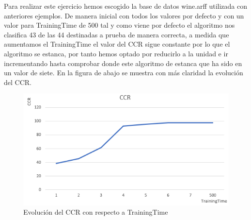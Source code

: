 Para realizar este ejercicio hemos escogido la base de datos wine.arff utilizada con anteriores ejemplos.
De manera inicial con todos los valores por defecto y con un valor para TrainingTime de 500 tal y como viene por defecto el algoritmo nos clasifica 43 de las 44 destinadas a prueba de manera correcta, a medida que aumentamos el TrainingTime el valor del CCR sigue constante por lo que el algoritmo se estanca, por tanto hemos optado por reducirlo a la unidad e ir incrementando hasta comprobar donde este algoritmo de estanca que ha sido en un valor de siete. En la figura de abajo se muestra con más claridad la evolución del CCR.
\begin{figure}[H]
    \centering
    \includegraphics[width=\textwidth]{img/GM.PNG}
    \caption{Evolución del CCR con respecto a TrainingTime}

\end{figure}
